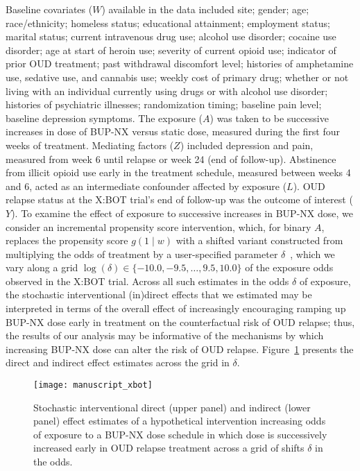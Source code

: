 Baseline covariates ($W$) available in the data included site; gender; age;
race/ethnicity; homeless status; educational attainment; employment status;
marital status; current intravenous drug use; alcohol use disorder; cocaine use
disorder; age at start of heroin use; severity of current opioid use; indicator
of prior OUD treatment; past withdrawal discomfort level; histories of
amphetamine use, sedative use, and cannabis use; weekly cost of primary drug;
whether or not living with an individual currently using drugs or with alcohol
use disorder; histories of psychiatric illnesses; randomization timing; baseline
pain level; baseline depression symptoms. The exposure ($A$) was taken to be
successive increases in dose of BUP-NX versus static dose, measured during the
first four weeks of treatment. Mediating factors ($Z$) included depression and
pain, measured from week 6 until relapse or week 24 (end of follow-up).
Abstinence from illicit opioid use early in the treatment schedule, measured
between weeks 4 and 6, acted as an intermediate confounder affected by exposure
($L$). OUD relapse status at the X:BOT trial's end of follow-up was the outcome
of interest ($Y$). To examine the effect of exposure to successive increases in
BUP-NX dose, we consider an incremental propensity score intervention, which,
for binary $A$, replaces the propensity score $g(1 \mid w)$ with a shifted
variant constructed from multiplying the odds of treatment by a user-specified
parameter $\delta$~\citep{kennedy2019nonparametric}, which we vary along a grid
$\log(\delta) \in \{-10.0, -9.5, \ldots, 9.5, 10.0\}$ of the exposure odds
observed in the X:BOT trial.
Across all such estimates in the odds $\delta$ of exposure, the stochastic
interventional (in)direct effects that we estimated may be interpreted
in terms of the overall effect of increasingly encouraging ramping up BUP-NX
dose early in treatment on the counterfactual risk of OUD relapse; thus, the
results of our analysis may be informative of the mechanisms by which increasing
BUP-NX dose can alter the risk of OUD relapse. Figure~\ref{fig:xbot_ipsi}
presents the direct and indirect effect estimates across the grid in $\delta$.
\begin{figure}[H]
  \centering
  \texttt{[image: manuscript\_xbot]}
  \caption{Stochastic interventional direct (upper panel) and indirect (lower
  panel) effect estimates of a hypothetical intervention increasing odds of
  exposure to a BUP-NX dose schedule in which dose is successively increased
  early in OUD relapse treatment across a grid of shifts $\delta$ in the odds.}
  \label{fig:xbot_ipsi}
\end{figure}
